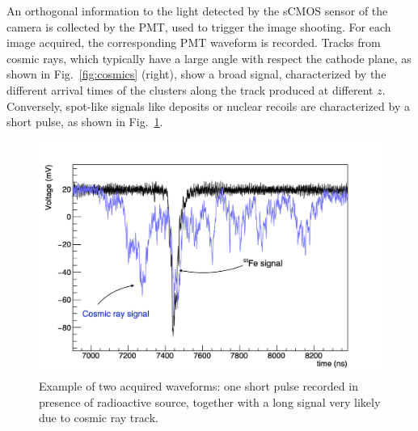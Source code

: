 An orthogonal information to the light detected by the sCMOS sensor of
the camera is collected by the PMT, used to trigger the image
shooting. For each image acquired, the corresponding PMT waveform is
recorded.  Tracks from cosmic rays, which typically have a large angle
with respect the cathode plane, as shown in Fig.~\ref{fig:cosmics}
(right), show a broad signal, characterized by the different arrival
times of the clusters along the track produced at different $z$. Conversely,
spot-like signals like \fe deposits or nuclear recoils are characterized by
a short pulse, as shown in Fig.~\ref{fig:waveforms}.
%
\begin{figure}[ht]
  \begin{center}
    \includegraphics[width=0.69\linewidth]{Waveforms.png}

    \caption{Example of two acquired waveforms: one short pulse
  recorded in presence of \fe radioactive source, together with a long
  signal very likely due to cosmic ray
  track.  \label{fig:waveforms}}

  \end{center}
\end{figure}

